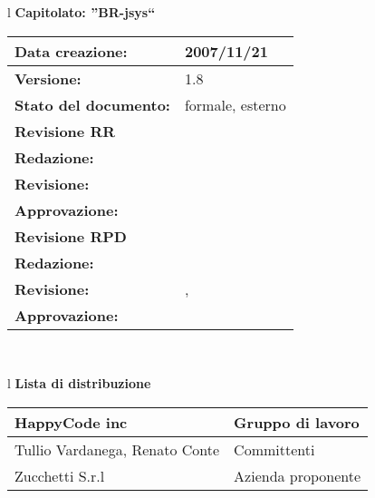 

\newcommand{\lv}{ 1.8 } %
\newcommand{\dt}{ Piano Di Progetto }%
\newcommand{\Glossario}{ Glossario.1.8.pdf }


\begin{center}
\thispagestyle{plain}
\begin{table}[htbp]

\large{
\begin{tabular}{l}
\Large{\textbf{\textsf{Capitolato: ''BR-jsys``}}} \\
\begin{tabular}{|p{6cm}|p{6cm}|} \hline
\textbf{Data creazione:} & 2007/11/21 \\ \hline
\textbf{Versione:} & \lv \\ \hline
\textbf{Stato del documento:} & formale, esterno \\ \hline
\textbf{Revisione RR} &  \\ \hline
\textbf{Redazione:} & \ET \\ \hline
\textbf{Revisione:} & \MT \\ \hline
\textbf{Approvazione:} & \ET \\ \hline
\textbf{Revisione RPD} &    \\ \hline
\textbf{Redazione:} & \MM \\ \hline
\textbf{Revisione:} & \ET , \FC \\ \hline
\textbf{Approvazione:}  & \MM \\  \hline
\end{tabular} \\
\end{tabular}
}
\end{table}

\begin{table}[hbtp]
\large{
\begin{tabular}{l}
\Large{\textbf{\textsf{Lista di distribuzione}}} \\
\begin{tabular}{|p{6cm}|p{6cm}|} \hline
{HappyCode inc}& Gruppo di lavoro\\ \hline
{Tullio Vardanega, Renato Conte}& Committenti \\ \hline 
{Zucchetti S.r.l}& Azienda proponente\\ \hline
\end{tabular} \\
\end{tabular}
}
\end{table}
\begin{table}[hbtp]


\end{table}
\end{center}
